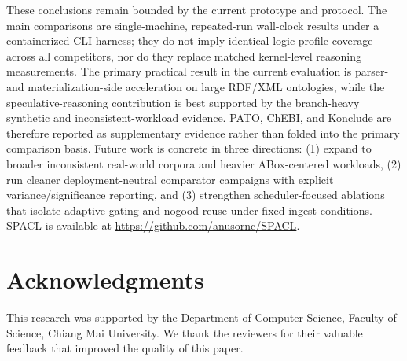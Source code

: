 \documentclass[preprint,12pt,times]{elsarticle}
\begin{document}
These conclusions remain bounded by the current prototype and protocol. The main comparisons are single-machine, repeated-run wall-clock results under a containerized CLI harness; they do not imply identical logic-profile coverage across all competitors, nor do they replace matched kernel-level reasoning measurements. The primary practical result in the current evaluation is parser- and materialization-side acceleration on large RDF/XML ontologies, while the speculative-reasoning contribution is best supported by the branch-heavy synthetic and inconsistent-workload evidence. PATO, ChEBI, and Konclude are therefore reported as supplementary evidence rather than folded into the primary comparison basis. Future work is concrete in three directions: (1) expand to broader inconsistent real-world corpora and heavier ABox-centered workloads, (2) run cleaner deployment-neutral comparator campaigns with explicit variance/significance reporting, and (3) strengthen scheduler-focused ablations that isolate adaptive gating and nogood reuse under fixed ingest conditions. SPACL is available at \url{https://github.com/anusornc/SPACL}.

\section*{Acknowledgments}
\label{sec:ack}

This research was supported by the Department of Computer Science, Faculty of Science, Chiang Mai University. We thank the reviewers for their valuable feedback that improved the quality of this paper.



\end{document}
